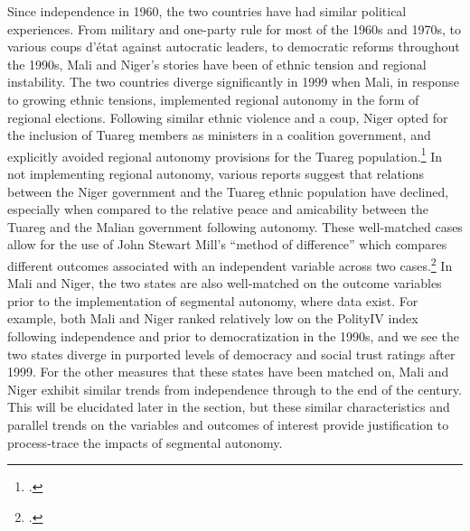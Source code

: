 \documentclass[12pt]{article}
\begin{document}
Since independence in 1960, the two countries have had similar political experiences. From military and one-party rule for most of the 1960s and 1970s, to various coups d’état against autocratic leaders, to democratic reforms throughout the 1990s, Mali and Niger's stories have been of ethnic tension and regional instability. The two countries diverge significantly in 1999 when Mali, in response to growing ethnic tensions, implemented regional autonomy in the form of regional elections. Following similar ethnic violence and a coup, Niger opted for the inclusion of Tuareg members as ministers in a coalition government, and explicitly avoided regional autonomy provisions for the Tuareg population.\footcite{minorities_at_risk_project_minorities_2009} In not implementing regional autonomy, various reports suggest that relations between the Niger government and the Tuareg ethnic population have declined, especially when compared to the relative peace and amicability between the Tuareg and the Malian government following autonomy. These well-matched cases allow for the use of John Stewart Mill's ``method of difference'' which compares different outcomes associated with an independent variable across two cases.\footcite{mill_system_1843} In Mali and Niger, the two states are also well-matched on the outcome variables prior to the implementation of segmental autonomy, where data exist. For example, both Mali and Niger ranked relatively low on the PolityIV index following independence and prior to democratization in the 1990s, and we see the two states diverge in purported levels of democracy and social trust ratings after 1999. For the other measures that these states have been matched on, Mali and Niger exhibit similar trends from independence through to the end of the century. This will be elucidated later in the section, but these similar characteristics and parallel trends on the variables and outcomes of interest provide justification to process-trace the impacts of segmental autonomy. 
\end{document}
